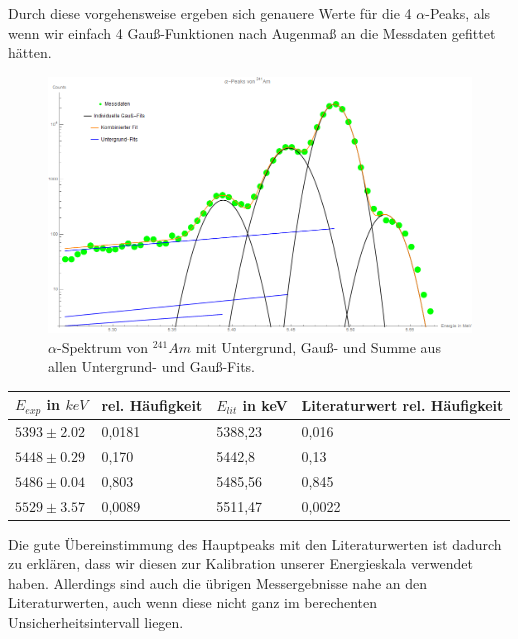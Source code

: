 \documentclass[bigchapter,colorback,accentcolor=tud4b,linedtoc,11pt]{tudreport}
\begin{document}
Durch diese vorgehensweise ergeben sich genauere Werte für die 4 $\alpha$-Peaks,
als wenn wir einfach 4 Gauß-Funktionen nach Augenmaß an die Messdaten gefittet hätten.

\begin{figure}[H] 
  \centering
     \includegraphics[width=1\textwidth]{img/alpha-spektrum.png}
  \caption{$\alpha$-Spektrum von $^{241}Am$ mit Untergrund, Gauß- und
    Summe aus allen Untergrund- und Gauß-Fits.}
  \label{fig:Bild1}
\end{figure}


\begin{center}
  \begin{tabular}{l|l|l|l}
    $E_{exp}$ in $keV$ & rel. Häufigkeit & $E_{lit}$ in keV & Literaturwert rel. Häufigkeit \\ \hline
    $5393 \pm 2.02$    & 0,0181          & 5388,23          & 0,016                         \\
    $5448 \pm 0.29$    & 0,170           & 5442,8           & 0,13                          \\
    $5486 \pm 0.04$    & 0,803           & 5485,56          & 0,845                         \\
    $5529 \pm 3.57$    & 0,0089          & 5511,47          & 0,0022                        \\
  \end{tabular}
\end{center}

Die gute Übereinstimmung des Hauptpeaks mit den Literaturwerten ist dadurch zu
erklären, dass wir diesen zur Kalibration unserer Energieskala verwendet
haben. Allerdings sind auch die übrigen Messergebnisse nahe an den
Literaturwerten, auch wenn diese nicht ganz im berechenten Unsicherheitsintervall liegen.
\end{document}
